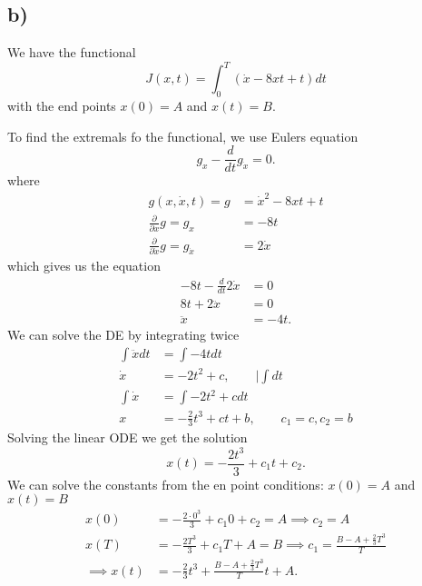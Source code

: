 \documentclass{article}
\begin{document}
\subsection*{b)}
We have the functional
\begin{equation}
	J(x,t) = \int_{0}^{T} (\dot{x} - 8xt +t) dt
\end{equation}
with the end points $x(0) = A$ and $x(t) = B$.

To find the extremals fo the functional, we use Eulers equation
\begin{equation}
	g_x-\frac{d}{dt}g_{\dot{x}} = 0.
\end{equation}
where
\begin{align}
	g(x,\dot{x},t) = g &= \dot{x}^2 - 8xt +t\\
	\frac{\partial}{\partial x} g= g_x &=  -8t \\
	\frac{\partial}{\partial \dot{x}} g= g_{\dot{x}} &=  2\dot{x}
\end{align}
which gives us the equation
\begin{align}
	-8t - \frac{d}{dt} 2\dot{x} &= 0\\
	8t + 2\ddot{x} &= 0\\
	\ddot{x} &= -4t.
\end{align}
We can solve the DE by integrating twice
\begin{align}
	\int\ddot{x}dt &= \int -4t dt\\
	\dot{x} &= -2t^2 +c, \qquad |\int dt\\
	\int \dot{x} &= \int -2t^2 +c dt\\
	x &= -\frac{2}{3}t^3+ct+b, \qquad c_1 = c, c_2 = b
\end{align}
Solving the linear ODE we get the solution 
\begin{equation}
	x(t) = -\frac{2t^3}{3} + c_1 t + c_2.
\end{equation}
We can solve the constants from the en point conditions: $x(0) = A$ and $x(t) = B$
\begin{align}
	x(0) &= -\frac{2\cdot0^3}{3} + c_1 0 + c_2 = A \implies c_2 = A\\
	x(T) &= -\frac{2T^3}{3} + c_1 T + A = B \implies c_1 = \frac{B-A + \frac{2}{3}T^3}{T} \\
	\implies x(t) &= -\frac{2}{3}t^3 + \frac{B-A + \frac{2}{3}T^3}{T} t + A.
\end{align}
\end{document}
